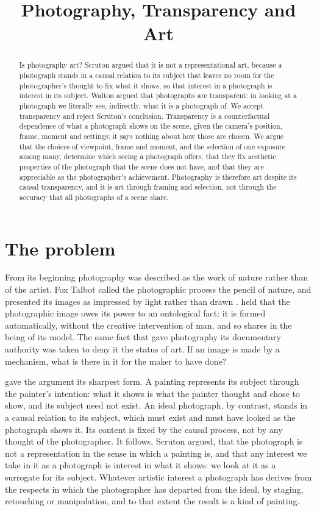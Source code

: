 \documentclass{situationist-preprint}
\title{Photography, Transparency and Art}
\begin{document}
\maketitle

\begin{abstract}
Is photography art? Scruton argued that it is not a representational art, because a photograph stands in a causal relation to its subject that leaves no room for the photographer's thought to fix what it shows, so that interest in a photograph is interest in its subject. Walton argued that photographs are transparent: in looking at a photograph we literally see, indirectly, what it is a photograph of. We accept transparency and reject Scruton's conclusion. Transparency is a counterfactual dependence of what a photograph shows on the scene, given the camera's position, frame, moment and settings; it says nothing about how those are chosen. We argue that the choices of viewpoint, frame and moment, and the selection of one exposure among many, determine which seeing a photograph offers, that they fix aesthetic properties of the photograph that the scene does not have, and that they are appreciable as the photographer's achievement. Photography is therefore art despite its causal transparency, and it is art through framing and selection, not through the accuracy that all photographs of a scene share.
\end{abstract}

\section{The problem}

From its beginning photography was described as the work of nature rather than of the artist. Fox Talbot called the photographic process the pencil of nature, and presented its images as impressed by light rather than drawn \citep{Talbot1844}. \citet{Bazin1960} held that the photographic image owes its power to an ontological fact: it is formed automatically, without the creative intervention of man, and so shares in the being of its model. The same fact that gave photography its documentary authority was taken to deny it the status of art. If an image is made by a mechanism, what is there in it for the maker to have done?

\citet{Scruton1981} gave the argument its sharpest form. A painting represents its subject through the painter's intention: what it shows is what the painter thought and chose to show, and its subject need not exist. An ideal photograph, by contrast, stands in a causal relation to its subject, which must exist and must have looked as the photograph shows it. Its content is fixed by the causal process, not by any thought of the photographer. It follows, Scruton argued, that the photograph is not a representation in the sense in which a painting is, and that any interest we take in it as a photograph is interest in what it shows: we look at it as a surrogate for its subject. Whatever artistic interest a photograph has derives from the respects in which the photographer has departed from the ideal, by staging, retouching or manipulation, and to that extent the result is a kind of painting.
\end{document}
